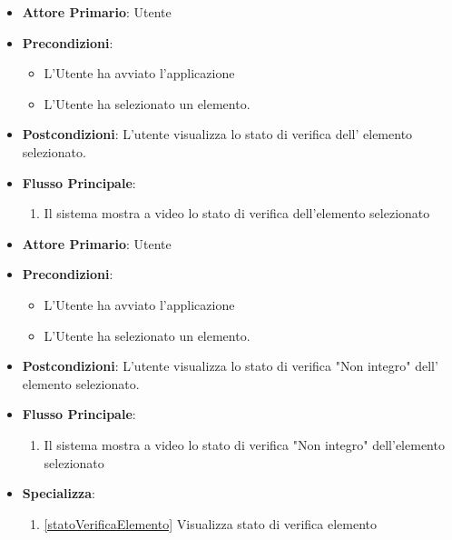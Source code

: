 \begin{itemize}
    \item \textbf{Attore Primario}: Utente
    \item \textbf{Precondizioni}: \begin{itemize}
        \item L'Utente ha avviato l'applicazione
        \item L'Utente ha selezionato un elemento.
    \end{itemize}
    \item \textbf{Postcondizioni}: L'utente visualizza lo stato di verifica dell' elemento selezionato.
    \item \textbf{Flusso Principale}:
    \begin{enumerate}
              \item Il sistema mostra a video lo stato di verifica dell'elemento selezionato
    \end{enumerate}
\end{itemize}

\begin{itemize}
    \item \textbf{Attore Primario}: Utente
    \item \textbf{Precondizioni}: \begin{itemize}
        \item L'Utente ha avviato l'applicazione
        \item L'Utente ha selezionato un elemento.
    \end{itemize}
    \item \textbf{Postcondizioni}: L'utente visualizza lo stato di verifica "Non integro" dell' elemento selezionato.
    \item \textbf{Flusso Principale}:
    \begin{enumerate}
              \item Il sistema mostra a video lo stato di verifica "Non integro" dell'elemento selezionato
    \end{enumerate}
    \item \textbf{Specializza}:
    \begin{enumerate}
              \item \ref{statoVerificaElemento} Visualizza stato di verifica elemento
    \end{enumerate}
\end{itemize}

